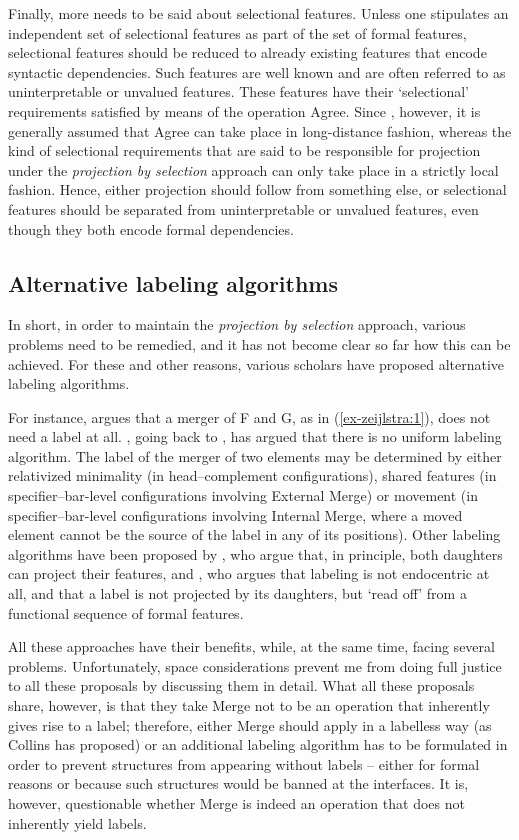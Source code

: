\documentclass[output=paper
,modfonts
,nonflat]{langsci/langscibook}
\begin{document}
Finally, more needs to be said about selectional features. Unless one stipulates an independent set of selectional features as part of the set of formal features, selectional features should be reduced to already existing features that encode syntactic dependencies. Such features are well known and are often referred to as uninterpretable or unvalued features. These features have their ‘selectional’ requirements satisfied by means of the operation Agree. Since \citet{Chomsky2001}, however, it is generally assumed that Agree can take place in long-distance fashion, whereas the kind of selectional requirements that are said to be responsible for projection under the \textit{projection by selection} approach can only take place in a strictly local fashion. Hence, either projection should follow from something else, or selectional features should be separated from uninterpretable or unvalued features, even though they both encode formal dependencies.

\subsection{Alternative labeling algorithms}
In short, in order to maintain the \textit{projection by selection} approach, various problems need to be remedied, and it has not become clear so far how this can be achieved. For these and other reasons, various scholars have proposed alternative labeling algorithms.

For instance, \citet{Collins2002} argues that a merger of F and G, as in (\ref{ex-zeijlstra:1}), does not need a label at all. \citet{Chomsky2013, Chomsky2015}, going back to \citet{Chomsky2008}, has argued that there is no uniform labeling algorithm. The label of the merger of two elements may be determined by either relativized minimality (in head–complement configurations), shared features (in specifier–bar-level configurations involving External Merge) or movement (in specifier–bar-level configurations involving Internal Merge, where a moved element cannot be the source of the label in any of its positions). Other labeling algorithms have been proposed by \citet{Cecchetto_Donati2010, Cecchetto_Donati2015}, who argue that, in principle, both daughters can project their features, and \citet{Adger2013}, who argues that labeling is not endocentric at all, and that a label is not projected by its daughters, but ‘read off’ from a functional sequence of formal features.

All these approaches have their benefits, while, at the same time, facing several problems. Unfortunately, space considerations prevent me from doing full justice to all these proposals by discussing them in detail. What all these proposals share, however, is that they take Merge not to be an operation that inherently gives rise to a label; therefore, either Merge should apply in a labelless way (as Collins has proposed) or an additional labeling algorithm has to be formulated in order to prevent structures from appearing without labels – either for formal reasons or because such structures would be banned at the interfaces. It is, however, questionable whether Merge is indeed an operation that does not inherently yield labels.
\end{document}
